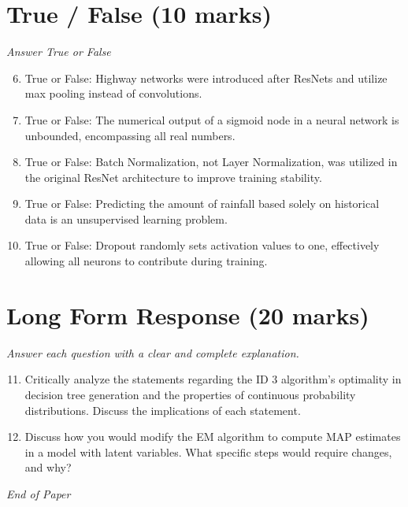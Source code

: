 \documentclass[12pt]{article}
\begin{document}
\section*{True / False (10 marks)}
\textit{Answer True or False}
\begin{enumerate}[label=\arabic*.]
\setcounter{enumi}{5}
\item True or False: Highway networks were introduced after ResNets and utilize max pooling instead of convolutions.
\item True or False: The numerical output of a sigmoid node in a neural network is unbounded, encompassing all real numbers.
\item True or False: Batch Normalization, not Layer Normalization, was utilized in the original ResNet architecture to improve training stability.
\item True or False: Predicting the amount of rainfall based solely on historical data is an unsupervised learning problem.
\item True or False: Dropout randomly sets activation values to one, effectively allowing all neurons to contribute during training.
\end{enumerate}

\section*{Long Form Response (20 marks)}
\textit{Answer each question with a clear and complete explanation.}
\begin{enumerate}[label=\arabic*.]
\setcounter{enumi}{10}
\item Critically analyze the statements regarding the ID 3 algorithm's optimality in decision tree generation and the properties of continuous probability distributions. Discuss the implications of each statement.
\item Discuss how you would modify the EM algorithm to compute MAP estimates in a model with latent variables. What specific steps would require changes, and why?
\end{enumerate}

\vfill
\noindent\textit{End of Paper}
\end{document}
